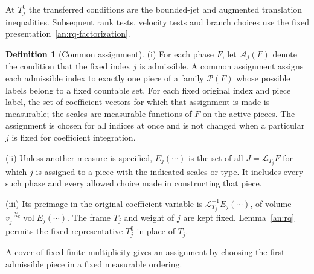 \documentclass[11pt]{amsart}
\theoremstyle{definition}
\newtheorem{definition}{Definition}[section]
\theoremstyle{remark}
\numberwithin{equation}{section}
\begin{document}
At $T_j^0$ the transferred conditions are the bounded-jet and augmented translation inequalities. Subsequent rank tests, velocity tests and branch choices use the fixed presentation~\eqref{an:rq-factorization}.

\begin{definition}[Common assignment]\label{def:assignment}
\leavevmode\noindent\textup{(i)} For each phase $F$, let $\mathcal A_j(F)$ denote the condition that the fixed index $j$ is admissible. A common assignment assigns each admissible index to exactly one piece of a family $\mathscr P(F)$ whose possible labels belong to a fixed countable set. For each fixed original index and piece label, the set of coefficient vectors for which that assignment is made is measurable; the scales are measurable functions of $F$ on the active pieces. The assignment is chosen for all indices at once and is not changed when a particular $j$ is fixed for coefficient integration.

\noindent\textup{(ii)} Unless another measure is specified, $E_j(\cdots)$ is the set of all $J=\mathcal L_{T_j}F$ for which $j$ is assigned to a piece with the indicated scales or type. It includes every such phase and every allowed choice made in constructing that piece.

\noindent\textup{(iii)} Its preimage in the original coefficient variable is $\mathcal L_{T_j}^{-1}E_j(\cdots)$, of volume $v_j^{-\chi_k}\operatorname{vol}E_j(\cdots)$. The frame $T_j$ and weight of $j$ are kept fixed. Lemma~\ref{an:rq} permits the fixed representative $T_j^0$ in place of $T_j$.
\end{definition}
A cover of fixed finite multiplicity gives an assignment by choosing the first admissible piece in a fixed measurable ordering.
\end{document}

